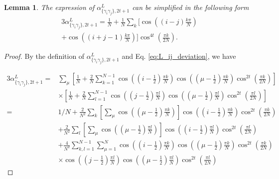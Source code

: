 \documentclass[journal=jctcce,a4paper,manuscript=article]{achemso}
\newtheorem{lemma}{Lemma}
\newcommand{\alpl}{\alpha_{\{\gamma_i\gamma_j\}, 2t+1}^{L}}
\begin{document}
\begin{lemma}
  \label{lemma: simplification of alpha L}
  The expression of $\alpl$ can be simplified in the following form
  \begin{equation}
    \label{eq: alpha L}
    \begin{aligned}
      3\alpl=\frac{1}{N}+\frac{1}{N} \sum_k\Big[\cos \left((i-j) \frac{k \pi}{N}\right) \\
        +\cos \left((i+j-1) \frac{k \pi}{N}\right)\Big] \cos ^{4 t}\left(\frac{\pi k}{2 N}\right).
    \end{aligned}
  \end{equation}
\end{lemma}
\begin{proof}
  By the definition of $\alpl$ and Eq. \ref{eq:L_ij_deviation}, we have

  \begin{align}
    3\alpl = & \sum_\mu \left[ \frac{1}{N} + \frac{2}{N} \sum_{k=1}^{N-1} \cos \left(\left(i-\frac{1}{2}\right) \frac{\pi k}{N}\right) \cos \left(\left(\mu-\frac{1}{2}\right) \frac{\pi k}{N}\right) \cos ^{2 t} \left( \frac{\pi k}{2 N} \right)\right] \nonumber \\
             & \times\left[ \frac{1}{N} + \frac{2}{N} \sum_{l=1}^{N-1} \cos \left(\left(j-\frac{1}{2}\right) \frac{\pi l}{N}\right) \cos \left(\left(\mu-\frac{1}{2}\right) \frac{\pi l}{N}\right) \cos ^{2 t}\left( \frac{\pi l}{2 N} \right)  \right] \nonumber   \\
    =        & 1/N + \frac{2}{N^2} \sum_k \left[\sum_\mu \cos\left(\left(\mu-\frac{1}{2}\right) \frac{\pi k}{N}\right)  \right]
    \cos \left(\left(i-\frac{1}{2}\right) \frac{\pi k}{N}\right) \cos ^{2 t} \left( \frac{\pi k}{2 N} \right)
    \label{eq: zz anonymous 9}
    \\
             & + \frac{2}{N^2} \sum_l \left[\sum_\mu \cos\left(\left(\mu-\frac{1}{2}\right) \frac{\pi l}{N}\right)  \right]
    \cos \left(\left(i-\frac{1}{2}\right) \frac{\pi l}{N}\right) \cos ^{2 t} \left( \frac{\pi l}{2 N} \right)
    \label{eq: zz anonymous 10}
    \\
             & + \frac{4}{N^2} \sum_{k,l =1}^{N-1} \sum_{\mu = 1}^{N} \cos \left(\left(i-\frac{1}{2}\right) \frac{\pi k}{N}\right) \cos \left(\left(\mu-\frac{1}{2}\right) \frac{\pi k}{N}\right) \cos ^{2 t} \left( \frac{\pi k}{2 N} \right)  \nonumber           \\
             & \times \cos \left(\left(j-\frac{1}{2}\right) \frac{\pi l}{N}\right) \cos \left(\left(\mu-\frac{1}{2}\right) \frac{\pi l}{N}\right) \cos ^{2 t}\left( \frac{\pi l}{2 N} \right)
    \label{eq: calculation of alpha L}
  \end{align}


\end{proof}
\end{document}
